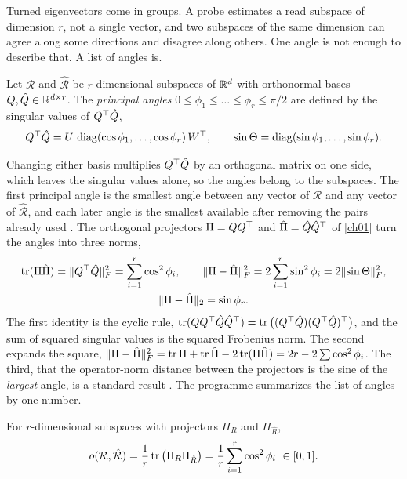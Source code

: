 Turned eigenvectors come in groups. A probe estimates a read subspace of
dimension $r$, not a single vector, and two subspaces of the same dimension can
agree along some directions and disagree along others. One angle is not enough
to describe that. A list of angles is.

\begin{definition}\label{def:ch13:angles}
Let $\mathcal R$ and $\hat{\mathcal R}$ be $r$-dimensional subspaces of $\mathbb{R}^d$ with
orthonormal bases $Q,\hat Q\in\mathbb{R}^{d\times r}$. The \emph{principal angles}
$0\le\phi_1\le\dots\le\phi_r\le\pi/2$ are defined by the singular values of
$Q^{\top}\hat Q$,
\begin{equation}\label{eq:ch13:angles}
Q^{\top}\hat Q=U\,\operatorname{diag}(\cos\phi_1,\dots,\cos\phi_r)\,W^{\top},\qquad
\sin\Theta=\operatorname{diag}(\sin\phi_1,\dots,\sin\phi_r).
\end{equation}
\end{definition}

Changing either basis multiplies $Q^{\top}\hat Q$ by an orthogonal matrix on one side,
which leaves the singular values alone, so the angles belong to the subspaces.
The first principal angle is the smallest angle between any vector of
$\mathcal R$ and any vector of $\hat{\mathcal R}$, and each later angle is the
smallest available after removing the pairs already used
\cite{golubvanloan2013}. The orthogonal projectors $\Pi=QQ^{\top}$ and
$\hat\Pi=\hat Q\hat Q^{\top}$ of \cref{ch01} turn the angles into three norms,
\begin{equation}\label{eq:ch13:projid}
\begin{gathered}
\operatorname{tr}(\Pi\hat\Pi)=\lVert Q^{\top}\hat Q\rVert_F^2=\sum_{i=1}^r\cos^2\phi_i,\qquad
\lVert \Pi-\hat\Pi\rVert_F^2=2\sum_{i=1}^r\sin^2\phi_i=2\lVert \sin\Theta\rVert_F^2,\\
\lVert \Pi-\hat\Pi\rVert_2=\sin\phi_r .
\end{gathered}
\end{equation}
The first identity is the cyclic rule,
$\operatorname{tr}(QQ^{\top}\hat Q\hat Q^{\top})=\operatorname{tr}\big((Q^{\top}\hat Q)(Q^{\top}\hat Q)^{\top}\big)$, and the sum of
squared singular values is the squared Frobenius norm. The second expands the
square, $\lVert \Pi-\hat\Pi\rVert_F^2=\operatorname{tr}\Pi+\operatorname{tr}\hat\Pi-2\operatorname{tr}(\Pi\hat\Pi)=2r-2\sum\cos^2\phi_i$.
The third, that the operator-norm distance between the projectors is the sine of
the \emph{largest} angle, is a standard result \cite{stewartsun1990,golubvanloan2013}. The
programme summarizes the list of angles by one number.

\begin{definition}\label{def:ch13:overlap}
For $r$-dimensional subspaces with projectors $\Pi_R$ and $\Pi_{\hat R}$,
\begin{equation}\label{eq:ch13:overlap}
o(\mathcal R,\hat{\mathcal R})=\frac1r\operatorname{tr}\big(\Pi_R\Pi_{\hat R}\big)=\frac1r\sum_{i=1}^r\cos^2\phi_i\ \in[0,1].
\end{equation}
\end{definition}

